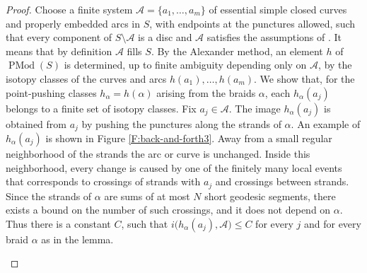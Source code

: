 \documentclass[11pt]{amsart}
\theoremstyle{definition}
\theoremstyle{remark}
\numberwithin{equation}{section}
\numberwithin{figure}{section}
\begin{document}
\begin{proof}
Choose a finite system $\mathcal A=\{a_1,\ldots,a_m\}$ of essential simple
closed curves and properly embedded arcs in $S$, with endpoints at the
punctures allowed, such that every component of
$S\setminus \mathcal A$ is a disc and $\mathcal A$ satisfies the assumptions of \cite[Proposition 2.8]{MR2850125}.
It means that by definition \(\mathcal A\) fills \(S\).
By the Alexander method, an element $h$ of $\operatorname{PMod}(S)$ is determined, 
up to finite ambiguity depending only on $\mathcal{A}$,
by the isotopy classes of the curves and arcs $h(a_1),\ldots,h(a_m)$.
We show that, for the point-pushing classes \(h_\alpha = h(\alpha)\) arising from
the braids \(\alpha\), each \(h_\alpha(a_j)\) belongs to a finite set of
isotopy classes.
Fix \(a_j\in \mathcal A\). The image \(h_\alpha(a_j)\) is obtained from
\(a_j\) by pushing the punctures along the strands of \(\alpha\). An example of 
$h_\alpha(a_j)$ is shown in Figure \ref{F:back-and-forth3}. Away from a
small regular neighborhood of the strands the arc or curve is unchanged.
Inside this neighborhood, every change is caused by one of the finitely many
local events that corresponds to crossings of strands with \(a_j\) 
and crossings between strands. Since the strands of $\alpha$ are 
sums of at most $N$ short geodesic segments, there exists a bound  
on the number of such crossings, and it does not depend on $\alpha$. 
Thus there is a constant \(C\), such that $i\bigl(h_\alpha(a_j),\mathcal A\bigr)\leq C$ 
for every \(j\) and for every braid \(\alpha\) as in the lemma.
\begin{center}
\begin{figure}
\end{figure}
\end{center}
\end{proof}
\end{document}
